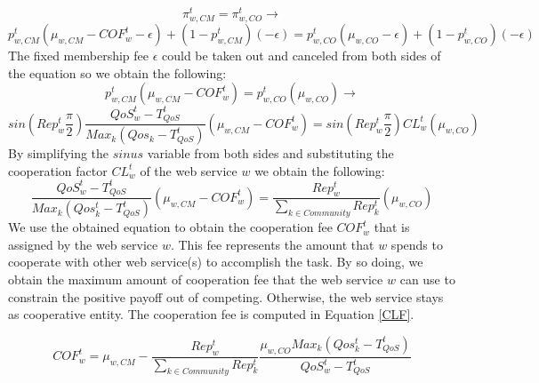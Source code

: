 \documentclass[fleqn]{singlecol-new}
\begin{document}
\begin{equation*}\label{equit}
\pi_{w,CM}^t=\pi_{w,CO}^t      \rightarrow
\end{equation*}
\begin{equation*}
p_{w,CM}^t(\mu_{w,CM}-COF_w^t-\epsilon)+(1-p_{w,CM}^t)(-\epsilon)=p_{w,CO}^t(\mu_{w,
CO}-\epsilon)+(1-p_{w,CO}^t)(-\epsilon)
\end{equation*}
The fixed membership fee $\epsilon$ could be taken out and
canceled from both sides of the equation so we obtain the
following:
\begin{equation*}
p_{w,CM}^t(\mu_{w,CM}-COF_w^t)=p_{w,CO}^t(\mu_{w,CO})\rightarrow
\end{equation*}
\begin{equation*}
sin(Rep^t_w\frac{\pi}{2})\frac{QoS_w^t-T_{QoS}^t}{Max_k(Qos_k-T_{QoS}^t)}(\mu_{w,
CM}-COF_w^t)=sin(Rep^t_w\frac{\pi}{2})CL_w^t(\mu_{w, CO})
\end{equation*}
By simplifying the $sinus$ variable from both sides and
substituting the cooperation factor $CL_w^t$ of the web service
$w$ we obtain the following:
\begin{equation*}
\frac{QoS_w^t-T_{QoS}^t}{Max_k(Qos_k^t-T_{QoS}^t)}(\mu_{w,CM}-COF_w^t)=\frac{Rep^t_w}{\sum_{k\in
Community}Rep^t_k}(\mu_{w, CO})
\end{equation*}
%
We use the obtained equation to obtain the cooperation fee
$COF_w^t$ that is assigned by the web service $w$. This fee
represents the amount that $w$ spends to cooperate with other web
service(s) to accomplish the task. By so doing, we obtain the
maximum amount of cooperation fee that the web service $w$ can use
to constrain the positive payoff out of competing. Otherwise, the
web service stays as cooperative entity. The cooperation fee is
computed in Equation \ref{CLF}.

\begin{equation}\label{CLF}
COF_w^t=\mu_{w,CM}-\frac{Rep^t_w}{\sum_{k\in
Community}Rep^t_k}\frac{\mu_{w,CO}Max_k(Qos_k^t-T_{QoS}^t)}{QoS_w^t-T_{QoS}^t}
\end{equation}
\end{document}
